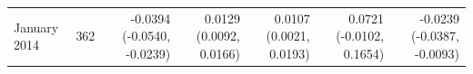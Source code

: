 \begin{tabular}{lrrrrrr}
January 2014 & 362 & -0.0394 (-0.0540, -0.0239) & 0.0129 (0.0092, 0.0166) & 0.0107 (0.0021, 0.0193) & 0.0721 (-0.0102, 0.1654) & -0.0239 (-0.0387, -0.0093) \\

\end{tabular}

